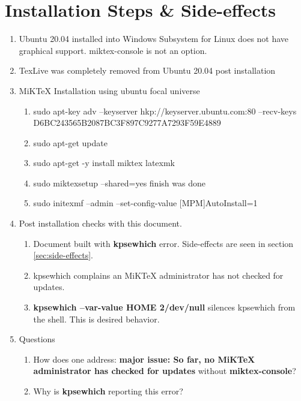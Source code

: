 \documentclass{article}%
\begin{document}
\section{Installation Steps \& Side-effects}%
\begin{enumerate}%
  \item Ubuntu 20.04 installed into Windows Subsystem for Linux does not have
    graphical support.  miktex-console is not an option.

  \item TexLive was completely removed from Ubuntu 20.04 post installation

  \item MiKTeX Installation using ubuntu focal universe

  \begin{enumerate}%
    \item sudo apt-key adv --keyserver hkp://keyserver.ubuntu.com:80 --recv-keys D6BC243565B2087BC3F897C9277A7293F59E4889

    \item sudo apt-get update 

    \item sudo apt-get -y install miktex latexmk

    \item sudo miktexsetup --shared=yes finish was done

    \item sudo initexmf --admin --set-config-value [MPM]AutoInstall=1
  \end{enumerate}%


  \item Post installation checks with this document.
  \begin{enumerate} 

    \item Document built with \textbf{kpsewhich} error.  Side-effects are
      seen in section \ref{sec:side-effects}.

    \item kpsewhich complains an MiKTeX administrator has not checked for
      updates.

    \item \textbf{kpsewhich --var-value HOME 2\>/dev/null} silences kpsewhich from
      the shell.  This is desired behavior.
  \end{enumerate}%


\item Questions
  \begin{enumerate} 

    \item How does one address: \textbf{major issue: So far, no MiKTeX
      administrator has checked for updates} without \textbf{miktex-console}?

    \item Why is \textbf{kpsewhich} reporting this error?


  \end{enumerate}%


\end{enumerate}%
\end{document}
